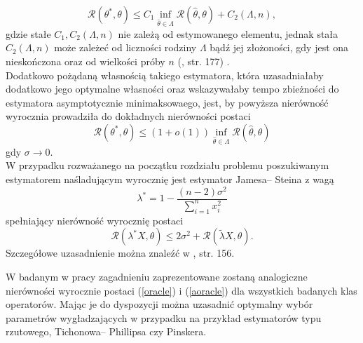\documentclass{mwart}
\begin{document}
\begin{equation}\label{oracle}
\mathcal{R}(\theta^*,\theta)\leq C_1 \inf_{\hat{\theta} \in \Lambda}\mathcal{R}(\hat{\theta},\theta)+C_2(\Lambda,n), 
\end{equation}
gdzie stałe $C_1,C_2(\Lambda,n)$ nie zależą od estymowanego elementu, jednak stała $C_2(\Lambda,n)$ może zależeć od liczności rodziny $\Lambda$ bądź jej złożoności, gdy jest ona nieskończona oraz od wielkości próby $n$ (\cite{mitchell}, str. 177) . \\
Dodatkowo pożądaną własnością takiego estymatora, która uzasadniałaby dodatkowo jego optymalne własności oraz wskazywałaby tempo zbieżności do estymatora asymptotycznie minimaksowaego, jest, by powyższa nierówność wyrocznia prowadziła do dokładnych nierówności postaci
\begin{equation}\label{aoracle}
\mathcal{R}(\theta^*,\theta)\leq(1+o(1))\inf_{\hat{\theta} \in \Lambda}\mathcal{R}(\hat{\theta},\theta)
\end{equation}
gdy $\sigma\to 0$.\\
W przypadku rozważanego na początku rozdziału problemu poszukiwanym estymatorem naśladującym wyrocznię jest estymator Jamesa-- Steina z wagą
\begin{displaymath}
\lambda^*=1-\frac{(n-2)\sigma^2}{\sum_{i=1}^nx_i^2}
\end{displaymath}
spełniający nierówność wyrocznię postaci
\begin{displaymath}
\mathcal{R}(\lambda^*X,\theta)\leq 2\sigma^2+\mathcal{R}(\tilde{\lambda} X,\theta).
\end{displaymath}
Szczegółowe uzasadnienie można znaleźć w \cite{wasserman}, str. 156.

W badanym w pracy zagadnieniu zaprezentowane zostaną analogiczne nierówności wyrocznie postaci (\ref{oracle}) i (\ref{aoracle}) dla wszystkich badanych klas operatorów. Mając je do dyspozycji można uzasadnić optymalny wybór parametrów wygładzających w przypadku na przykład estymatorów typu rzutowego, Tichonowa-- Phillipsa czy Pinskera.\\
\end{document}
